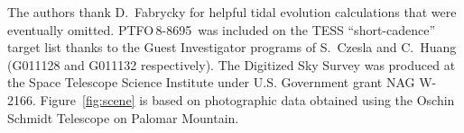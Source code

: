 \documentclass[12pt,twocolumn,tighten]{aastex62}
\newcommand{\ptfo}{PTFO$\,$8-8695}
\begin{document}

\acknowledgements
%
%
%
The authors thank D.~Fabrycky for helpful tidal evolution calculations
that were eventually omitted.
%
\ptfo\ was included on the TESS ``short-cadence'' target list thanks to the
Guest Investigator programs of S.\ Czesla and C.\ Huang (G011128 and
G011132 respectively).
%
The Digitized Sky Survey was produced at the Space Telescope Science
Institute under U.S. Government grant NAG W-2166.
Figure~\ref{fig:scene} is based on photographic data obtained using
the Oschin Schmidt Telescope on Palomar Mountain.
%
%
%
%
\end{document}

